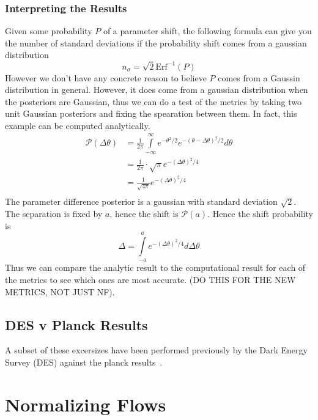 \subsubsection{Interpreting the Results}
Given some probability $P$ of a parameter shift, the following formula can give you the number of standard deviations if the probability shift comes from a gaussian distribution
\begin{equation}
	n_\sigma = \sqrt{2} \text{Erf}^{-1}(P)
\end{equation}
However we don't have any concrete reason to believe $P$ comes from a Gaussin distribution in general. However, it does come from a gaussian distribution when the posteriors are Gaussian, thus we can do a test of the metrics by taking two unit Gaussian posteriors and fixing the spearation between them. In fact, this example can be computed analytically.
\begin{equation}
    \begin{split}
	\mathcal{P}(\Delta \theta) &= \frac{1}{2\pi} \int\limits_{-\infty}^{\infty} e^{-\theta^2/2} e^{-{(\theta-\Delta\theta)}^2/2}  d\theta \\
				  			   &= \frac{1}{2\pi} \cdot \sqrt{\pi} e^{-{(\Delta\theta)}^2/4}\\
				   			   &= \frac{1}{\sqrt{4\pi}}e^{-{(\Delta\theta)}^2/4}\\
    \end{split}
\end{equation}
The parameter difference posterior is a gaussian with standard deviation $\sqrt{2}$. The separation is fixed by $a$, hence the shift is $\mathcal{P}(a)$. Hence the shift probability is
\begin{equation}
	\Delta = \int\limits_{-a}^{a} e^{-{(\Delta\theta)}^2/4} d\Delta\theta
\end{equation}
Thus we can compare the analytic result to the computational result for each of the metrics to see which ones are most accurate. (DO THIS FOR THE NEW METRICS, NOT JUST NF).

\subsection{DES v Planck Results}
A subset of these excersizes have been performed previously by the Dark Energy Survey (DES) against the planck results~\cite{lemos_assessing_2021}.

\section{Normalizing Flows}

